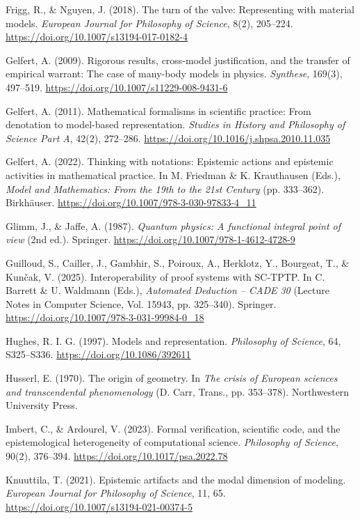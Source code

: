 \documentclass[pdflatex,sn-apa]{sn-jnl}
\begin{document}
\noindent Frigg, R., \& Nguyen, J. (2018). The turn of the valve: Representing with material models. \emph{European Journal for Philosophy of Science}, 8(2), 205--224. \url{https://doi.org/10.1007/s13194-017-0182-4}\par\medskip

\noindent Gelfert, A. (2009). Rigorous results, cross-model justification, and the transfer of empirical warrant: The case of many-body models in physics. \emph{Synthese}, 169(3), 497--519. \url{https://doi.org/10.1007/s11229-008-9431-6}\par\medskip

\noindent Gelfert, A. (2011). Mathematical formalisms in scientific practice: From denotation to model-based representation. \emph{Studies in History and Philosophy of Science Part A}, 42(2), 272--286. \url{https://doi.org/10.1016/j.shpsa.2010.11.035}\par\medskip

\noindent Gelfert, A. (2022). Thinking with notations: Epistemic actions and epistemic activities in mathematical practice. In M. Friedman \& K. Krauthausen (Eds.), \emph{Model and Mathematics: From the 19th to the 21st Century} (pp. 333--362). Birkhäuser. \url{https://doi.org/10.1007/978-3-030-97833-4_11}\par\medskip

\noindent Glimm, J., \& Jaffe, A. (1987). \emph{Quantum physics: A functional integral point of view} (2nd ed.). Springer. \url{https://doi.org/10.1007/978-1-4612-4728-9}\par\medskip

\noindent Guilloud, S., Cailler, J., Gambhir, S., Poiroux, A., Herklotz, Y., Bourgeat, T., \& Kunčak, V. (2025). Interoperability of proof systems with SC-TPTP. In C. Barrett \& U. Waldmann (Eds.), \emph{Automated Deduction -- CADE 30} (Lecture Notes in Computer Science, Vol. 15943, pp. 325--340). Springer. \url{https://doi.org/10.1007/978-3-031-99984-0_18}\par\medskip

\noindent Hughes, R. I. G. (1997). Models and representation. \emph{Philosophy of Science}, 64, S325--S336. \url{https://doi.org/10.1086/392611}\par\medskip

\noindent Husserl, E. (1970). The origin of geometry. In \emph{The crisis of European sciences and transcendental phenomenology} (D. Carr, Trans., pp. 353--378). Northwestern University Press.\par\medskip
\noindent Imbert, C., \& Ardourel, V. (2023). Formal verification, scientific code, and the epistemological heterogeneity of computational science. \emph{Philosophy of Science}, 90(2), 376--394. \url{https://doi.org/10.1017/psa.2022.78}\par\medskip
\noindent Knuuttila, T. (2021). Epistemic artifacts and the modal dimension of modeling. \emph{European Journal for Philosophy of Science}, 11, 65. \url{https://doi.org/10.1007/s13194-021-00374-5}\par\medskip
\end{document}
